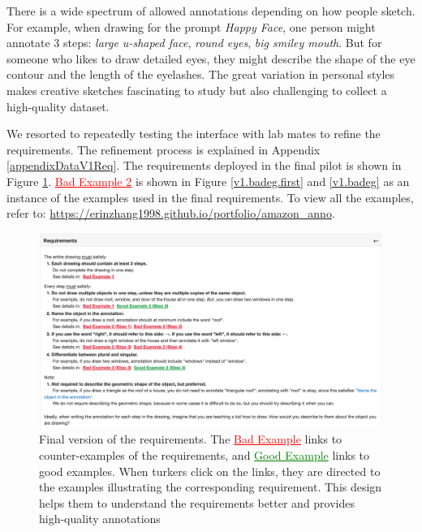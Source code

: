 There is a wide spectrum of allowed annotations depending on how people sketch. For example, when drawing for the prompt \textit{Happy Face}, one person might annotate 3 steps: \textit{large u-shaped face}, \textit{round eyes}, \textit{big smiley mouth}. But for someone who likes to draw detailed eyes, they might describe the shape of the eye contour and the length of the eyelashes. 
The great variation in personal styles makes creative sketches fascinating to study but also challenging to collect a high-quality dataset. 

We resorted to repeatedly testing the interface with lab mates to refine the requirements. The refinement process is explained in Appendix \ref{appendixDataV1Req}. 
The requirements deployed in the final pilot is shown in Figure \ref{v1.requirement}.
\textcolor{red}{\underline{Bad Example 2}} is shown in Figure \ref{v1.badeg.first} and \ref{v1.badeg} as an instance of the examples used in the final requirements. 
To view all the examples, refer to: \url{https://erinzhang1998.github.io/portfolio/amazon_anno}. 


\begin{figure}[!h]
\includegraphics[width=\linewidth]{data_collection/v1_requirement.png}  
\caption{Final version of the requirements. The \textcolor{red}{\underline{Bad Example}} links to counter-examples of the requirements, and \textcolor{green}{\underline{Good Example}} links to good examples. When turkers click on the links, they are directed to the examples illustrating the corresponding requirement. This design helps them to understand the requirements better and provides high-quality annotations}
\label{v1.requirement}
\end{figure}

